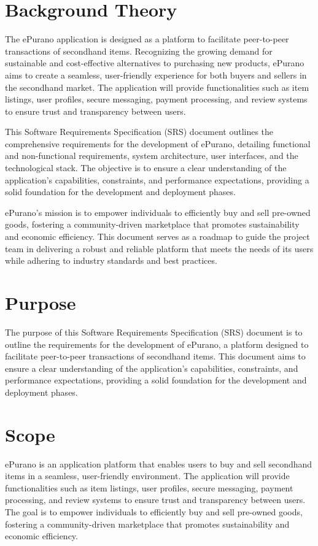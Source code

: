 \section{Background Theory}

The ePurano application is designed as a platform to facilitate peer-to-peer transactions of secondhand items. Recognizing the growing demand for sustainable and cost-effective alternatives to purchasing new products, ePurano aims to create a seamless, user-friendly experience for both buyers and sellers in the secondhand market. The application will provide functionalities such as item listings, user profiles, secure messaging, payment processing, and review systems to ensure trust and transparency between users.

This Software Requirements Specification (SRS) document outlines the comprehensive requirements for the development of ePurano, detailing functional and non-functional requirements, system architecture, user interfaces, and the technological stack. The objective is to ensure a clear understanding of the application's capabilities, constraints, and performance expectations, providing a solid foundation for the development and deployment phases.

ePurano's mission is to empower individuals to efficiently buy and sell pre-owned goods, fostering a community-driven marketplace that promotes sustainability and economic efficiency. This document serves as a roadmap to guide the project team in delivering a robust and reliable platform that meets the needs of its users while adhering to industry standards and best practices.

\section{Purpose}

The purpose of this Software Requirements Specification (SRS) document is to outline the requirements for the development of ePurano, a platform designed to facilitate peer-to-peer transactions of secondhand items. This document aims to ensure a clear understanding of the application's capabilities, constraints, and performance expectations, providing a solid foundation for the development and deployment phases.

\section{Scope}

ePurano is an application platform that enables users to buy and sell secondhand items in a seamless, user-friendly environment. The application will provide functionalities such as item listings, user profiles, secure messaging, payment processing, and review systems to ensure trust and transparency between users. The goal is to empower individuals to efficiently buy and sell pre-owned goods, fostering a community-driven marketplace that promotes sustainability and economic efficiency.


